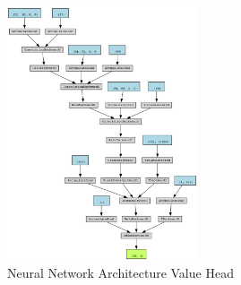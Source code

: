 \begin{figure}
    \centering
    \includegraphics[width=0.5\textwidth]{Bilder/value_graph.png}
    \caption{Neural Network Architecture Value Head}
    \label{fig:value_graph}
\end{figure}



